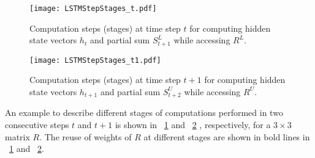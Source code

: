 \begin{comment}
\begin{figure*}[htbp]
	\centerline{\texttt{[image: proposedWithInit\_withH.pdf]}}
	\caption{Computation of consecutive hidden state vectors $h_1$, $h_2$ and $h_3$ while accessing $R$ matrix from off-chip memory.}
	\label{fig:ExampleComputation}
\end{figure*}
\figurename{~\ref{fig:ExampleComputation}} illustrates the compute-steps (C1 to C9) and weights accessed for computing the outputs of two time steps for $N{=}3$. The shaded rectangular blocks shows the product terms input from the previous time step ($t{=}1$). When all the product terms ($R[k][j]{\cdot}h_{t-1}[j]$) for the partial sum vector  element ($S_t[k]$) are computed, then $h_t[k]$ is computed (shown as pink blocks in \figurename{\ref{fig:ExampleComputation}}). The weights of $R$ are reused for the product terms $R[k][j]{\cdot}h_{t}[j]$ for computing the partial sum $S_{t+1}$, using the values of $h_t$ computed in previous or present compute-step. As shown in \figurename{\ref{fig:ExampleComputation}} matrix $R$ is accessed in 9 compute-steps ($N{\times}N$) to compute $h_t$ and $h_{t+1}$ and the partial sum $S_{t+2}$ for the next time step ($t{+}1$).
\end{comment}
\begin{figure}[htbp]
	\centerline{\texttt{[image: LSTMStepStages\_t.pdf]}}
	\caption{Computation steps (stages) at time step $t$ for computing hidden state vectors $h_t$ and partial sum $S^L_{t{+}1}$ while accessing $R^L$.}
	\label{fig:ExampleComputation_t}
\end{figure}
\begin{figure}[htbp]
	\centerline{\texttt{[image: LSTMStepStages\_t1.pdf]}}
	\caption{Computation steps (stages) at time step $t{+}1$ for computing hidden state vectors $h_{t+1}$ and partial sum $S^U_{t{+}2}$ while accessing $R^U$.}
	\label{fig:ExampleComputation_t+1}
\end{figure}
An example to describe different stages of computations performed in two consecutive steps $t$ and $t{+}1$ is shown in \figurename{~\ref{fig:ExampleComputation_t}} and \figurename{~\ref{fig:ExampleComputation_t+1}} , respectively, for a $3{\times}3$ matrix $R$.  The reuse of weights of $R$ at different stages are shown in bold lines in  \figurename{~\ref{fig:ExampleComputation_t}} and \figurename{~\ref{fig:ExampleComputation_t+1}}.

